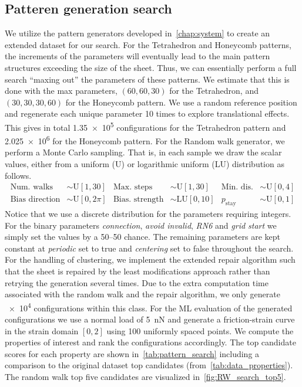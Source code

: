 \subsection{Patteren generation search}\label{sec:gen_search}
We utilize the pattern generators developed in~\cref{chap:system} to create an
extended dataset for our search. For the Tetrahedron and Honeycomb patterns, the
increments of the parameters will eventually lead to the main pattern structures
exceeding the size of the sheet. Thus, we can essentially perform a full search
``maxing out'' the parameters of these patterns. We estimate that this is done
with the max parameters, $(60, 60, 30)$ for the Tetrahedron, and $(30, 30, 30,
60)$ for the Honeycomb pattern. We use a random reference position and
regenerate each unique parameter 10 times to explore translational effects. This
gives in total \num{1.35e5} configurations for the Tetrahedron pattern and
\num{2.025e6} for the Honeycomb pattern. For the Random walk generator, we perform a
Monte Carlo sampling. That is, in each sample we draw the scalar values, either from a
uniform (U) or logarithmic uniform (LU) distribution as follows.
\begin{align*}
  \text{Num.\ walks} &\sim \text{U}[1, 30] & \text{Max.\ steps} &\sim \text{U}[1,30]  & \text{Min.\ dis.} &\sim \text{U}[0,4] \\
  \text{Bias direction} &\sim \text{U}[0, 2\pi] & \text{Bias.\ strength} &\sim \text{LU}[0,10]  & p_{\text{stay}} &\sim \text{U}[0,1]  
\end{align*}
Notice that we use a discrete distribution for the parameters requiring
integers. For the binary parameters \textit{connection}, \textit{avoid invalid},
\textit{RN6} and \textit{grid start} we simply set the values by a 50--50
chance. The remaining parameters are kept constant at \textit{periodic} set to
true and \textit{centering} set to false throughout the search. For the handling
of clustering, we implement the extended repair algorithm such that the sheet is repaired by the least modifications approach rather than retrying the generation several times. Due to the extra
computation time associated with the random walk and the repair algorithm, we
only generate \num{e4} configurations within this class. For the \acrshort{ML}
evaluation of the generated configurations we use a normal load of \SI{5}{nN} and generate
a friction-strain curve in the strain domain $[0,2]$ using 100 uniformly spaced points. We compute
the properties of interest and rank the configurations accordingly. The top
candidate scores for each property are shown in~\cref{tab:pattern_search} including a comparison to the original dataset top candidates (from~\cref{tab:data_properties}). The random walk top five candidates are
visualized in~\cref{fig:RW_search_top5}.


